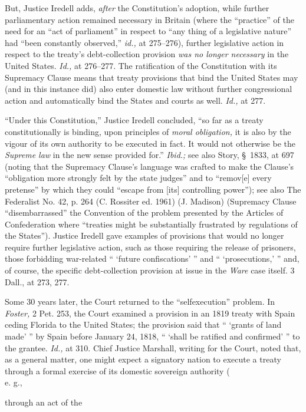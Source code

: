 {%

  But, Justice Iredell adds, \emph{after} the Constitution's adoption,
while further parliamentary action remained necessary in Britain
(where the ``practice'' of the need for an ``act of parliament''
in respect to ``any thing of a legislative nature'' had ``been
constantly observed,'' \emph{id.,} at 275--276), further legislative
action in respect to the treaty's debt-collection provision \emph{was no
longer necessary} in the United States. \emph{Id.,} at 276--277. The
ratification of the Constitution with its Supremacy Clause means that
treaty provisions that bind the United States may (and in this instance
did) also enter domestic law without further congressional action and
automatically bind the States and courts as well. \emph{Id.,} at 277.

  ``Under this Constitution,'' Justice Iredell concluded, ``so far
as a treaty constitutionally is binding, upon principles of \emph{moral
obligation,} it is also by the vigour of its own authority to be
executed in fact. It would not otherwise be the \emph{Supreme law} in the
new sense provided for.'' \emph{Ibid.;} see also Story, \S~1833, at
697 (noting that the Supremacy Clause's language was crafted to make
the Clause's ``obligation more strongly felt by the state judges''
and to ``remov[e] every pretense'' by which they could ``escape from
[its] controlling power''); see also The Federalist No. 42, p. 264 (C.
Rossiter ed. 1961) (J. Madison) (Supremacy Clause ``disembarrassed''
the Convention of the problem presented by the Articles of Confederation
where ``treaties might be substantially frustrated by regulations of
the States''). Justice Ire\newpage dell gave examples of provisions
that would no longer require further legislative action, such as those
requiring the release of prisoners, those forbidding war-related ``
‘future confiscations' '' and `` ‘prosecutions,' '' and, of
course, the specific debt-collection provision at issue in the \emph{Ware}
case itself. 3 Dall., at 273, 277.

  Some 30 years later, the Court returned to the ``selfexecution''
problem. In \emph{Foster,} 2 Pet. 253, the Court examined a provision
in an 1819 treaty with Spain ceding Florida to the United States; the
provision said that `` ‘grants of land made' '' by Spain before
January 24, 1818, `` ‘shall be ratified and confirmed' '' to
the grantee. \emph{Id.,} at 310. Chief Justice Marshall, writing
for the Court, noted that, as a general matter, one might expect a
signatory nation to execute a treaty through a formal exercise of
its domestic sovereign authority (\\e. g.,} through an act of the
